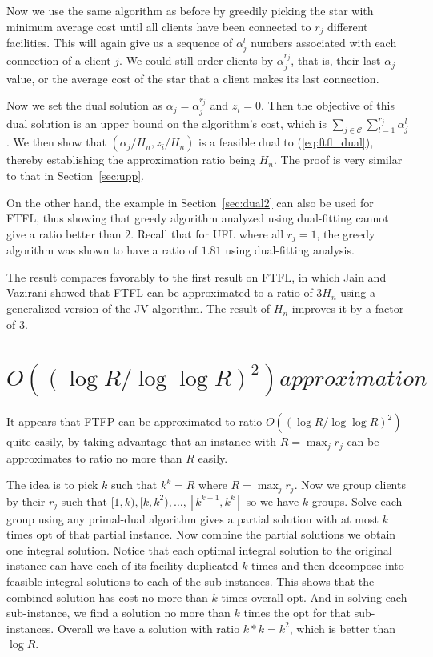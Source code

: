 \documentclass[11pt]{article}
\begin{document}
Now we use the same algorithm as before by greedily picking the star
with minimum average cost until all clients have been connected to
$r_j$ different facilities. This will again give us a sequence of
$\alpha_j^l$ numbers associated with each connection of a client
$j$. We could still order clients by $\alpha_j^{r_j}$, that is, their
last $\alpha_j$ value, or the average cost of the star that a client
makes its last connection.

Now we set the dual solution as $\alpha_j = {\alpha_j^{r_j}}$ and $z_i
= 0$. Then the objective of this dual solution is an upper bound on
the algorithm's cost, which is $\sum_{j\in\mathcal{C}}\sum_{l=1}^{r_j}
\alpha_j^l$. We then show that $(\alpha_j/H_n, z_i/H_n)$ is a feasible
dual to (\ref{eq:ftfl_dual}), thereby establishing the approximation
ratio being $H_n$. The proof is very similar to that in
Section~\ref{sec:upp}.

On the other hand, the example in Section~\ref{sec:dual2} can also be
used for FTFL, thus showing that greedy algorithm analyzed using
dual-fitting cannot give a ratio better than $2$. Recall that for UFL
where all $r_j=1$, the greedy algorithm was shown to have a ratio of
$1.81$ using dual-fitting analysis.

The result compares favorably to the first result on FTFL, in which
Jain and Vazirani showed that FTFL can be approximated to a ratio of
$3H_n$ using a generalized version of the JV algorithm. The result of
$H_n$ improves it by a factor of $3$.

\section{$O((\log R/\log\log R)^2) approximation$}
It appears that FTFP can be approximated to ratio $O((\log R / \log\log
R)^2)$ quite easily, by taking advantage that an instance with $R =
\max_j r_j$ can be approximates to ratio no more than $R$ easily.

The idea is to pick $k$ such that $k^k = R$ where $R = \max_j
r_j$. Now we group clients by their $r_j$ such that $[1,k), [k,k^2),
\ldots, [k^{k-1}, k^k]$ so we have $k$ groups. Solve each group using
any primal-dual algorithm gives a partial solution with at most $k$
times opt of that partial instance. Now combine the partial solutions
we obtain one integral solution. Notice that each optimal integral
solution to the original instance can have each of its facility
duplicated $k$ times and then decompose into feasible integral
solutions to each of the sub-instances. This shows that the combined
solution has cost no more than $k$ times overall opt. And in solving
each sub-instance, we find a solution no more than $k$ times the opt
for that sub-instances. Overall we have a solution with ratio $k*k =
k^2$, which is better than $\log R$.
\end{document}

